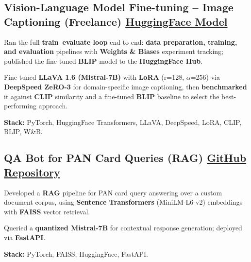 \documentclass[letter,10pt]{article}
\begin{document}
\subsection{Vision-Language Model Fine-tuning – Image Captioning (Freelance) \hfill \href{https://huggingface.co/sunil448832/blip-model}{HuggingFace Model}}
\begin{zitemize}
\item Ran the full \textbf{train--evaluate loop} end to end: \textbf{data preparation, training, and evaluation} pipelines with \textbf{Weights \& Biases} experiment tracking; published the fine-tuned \textbf{BLIP} model to the \textbf{HuggingFace Hub}.
\item Fine-tuned \textbf{LLaVA 1.6 (Mistral-7B)} with \textbf{LoRA} (r=128, $\alpha$=256) via \textbf{DeepSpeed ZeRO-3} for domain-specific image captioning, then \textbf{benchmarked} it against \textbf{CLIP} similarity and a fine-tuned \textbf{BLIP} baseline to select the best-performing approach.
\item \textbf{Stack:} PyTorch, HuggingFace Transformers, LLaVA, DeepSpeed, LoRA, CLIP, BLIP, W\&B.
\end{zitemize}

\subsection{QA Bot for PAN Card Queries (RAG) \hfill \href{https://github.com/sunil448832/Natural-Language-Processing/tree/master/RAG(Retrieval\%20Augment\%20Generation)}{GitHub Repository}}
\begin{zitemize}
\item Developed a \textbf{RAG} pipeline for PAN card query answering over a custom document corpus, using \textbf{Sentence Transformers} (MiniLM-L6-v2) embeddings with \textbf{FAISS} vector retrieval.
\item Queried a \textbf{quantized Mistral-7B} for contextual response generation; deployed via \textbf{FastAPI}.
\item \textbf{Stack:} PyTorch, FAISS, HuggingFace, FastAPI.
\end{zitemize}
\end{document}
